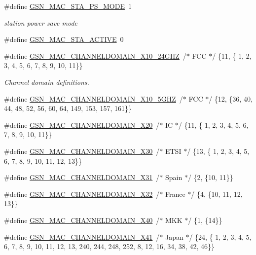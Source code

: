\begin{DoxyCompactItemize}
\item 
\#define \hyperlink{a00642_gaab8abe9d2ed942b0aac9ae3f562e204a}{GSN\_\-MAC\_\-STA\_\-PS\_\-MODE}~1
\begin{DoxyCompactList}\small\item\em station power save mode \end{DoxyCompactList}\item 
\#define \hyperlink{a00642_gaa20efb0a2c9950b1601e9a681c9372be}{GSN\_\-MAC\_\-STA\_\-ACTIVE}~0
\end{DoxyCompactItemize}
\begin{DoxyCompactItemize}
\item 
\#define \hyperlink{a00642_gadef528ef0222b55050b526f2acd1e545}{GSN\_\-MAC\_\-CHANNELDOMAIN\_\-X10\_\-24GHZ}~/$\ast$ FCC    $\ast$/ \{11, \{ 1,  2,  3,  4,  5,  6,  7,  8,  9, 10, 11\}\}
\begin{DoxyCompactList}\small\item\em Channel domain definitions. \end{DoxyCompactList}\item 
\#define \hyperlink{a00642_ga3ad89b43471f5e0ec1a3fb38092a322d}{GSN\_\-MAC\_\-CHANNELDOMAIN\_\-X10\_\-5GHZ}~/$\ast$ FCC    $\ast$/ \{12, \{36, 40, 44, 48, 52, 56, 60, 64, 149, 153, 157, 161\}\}
\item 
\#define \hyperlink{a00642_gad25876d674bda6a842556d3b3194ab50}{GSN\_\-MAC\_\-CHANNELDOMAIN\_\-X20}~/$\ast$ IC     $\ast$/ \{11, \{ 1,  2,  3,  4,  5,  6,  7,  8,  9, 10, 11\}\}
\item 
\#define \hyperlink{a00642_ga9bdd8d819efafbf6ee3f9a9372b8b4ab}{GSN\_\-MAC\_\-CHANNELDOMAIN\_\-X30}~/$\ast$ ETSI   $\ast$/ \{13, \{ 1,  2,  3,  4,  5,  6,  7,  8,  9, 10, 11, 12, 13\}\}
\item 
\#define \hyperlink{a00642_ga2fa52e7994dae2b65aa764cebd4b08a6}{GSN\_\-MAC\_\-CHANNELDOMAIN\_\-X31}~/$\ast$ Spain  $\ast$/ \{2,  \{10, 11\}\}
\item 
\#define \hyperlink{a00642_ga674bc6383fba8ff146b4741af9ed8494}{GSN\_\-MAC\_\-CHANNELDOMAIN\_\-X32}~/$\ast$ France $\ast$/ \{4,  \{10, 11, 12, 13\}\}
\item 
\#define \hyperlink{a00642_ga28a20ad2b2d714e7729976e3778428a0}{GSN\_\-MAC\_\-CHANNELDOMAIN\_\-X40}~/$\ast$ MKK    $\ast$/ \{1,  \{14\}\}
\item 
\#define \hyperlink{a00642_gacb2f3c46d39cb7547bf13a2cf2da53c6}{GSN\_\-MAC\_\-CHANNELDOMAIN\_\-X41}~/$\ast$ Japan  $\ast$/ \{24, \{ 1,  2,  3,  4,  5,  6,  7,  8,  9, 10, 11, 12, 13, 240, 244, 248, 252, 8, 12, 16, 34, 38, 42, 46\}\}

\end{DoxyCompactItemize}
